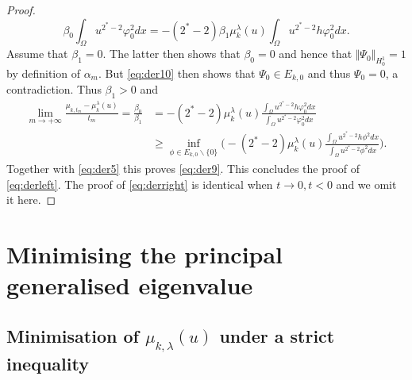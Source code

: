 \documentclass[10pt]{amsart}
\numberwithin{equation}{section}
\newcommand{\vp}{\varphi}
\newcommand{\Om}{\Omega}
\newcommand{\mkl}{\mu_{k}^{\lambda}}
\theoremstyle{plain}
\theoremstyle{remark}
\begin{document}
\begin{proof}
 $$\beta_0 \int_{\Om} u^{2^*-2} \vp_0^2dx = - (2^*-2) \beta_1 \mkl(u) \int_{\Om} u^{2^*-2} h \vp_0^2dx. $$
 Assume that $\beta_1 = 0$. The latter then shows that $\beta_0 = 0$ and hence that $\Vert \Psi_0\Vert_{H^1_0} = 1$ by definition of $\alpha_m$. But \eqref{eq:der10} then shows that $\Psi_0 \in E_{k,0}$ and thus $\Psi_0 = 0$, a contradiction. Thus $\beta_1 >0$ and
 $$ \begin{aligned}
\lim_{m \to + \infty} \frac{\mu_{k,t_m} - \mkl(u)}{t_m} 
 = \frac{\beta_0}{\beta_1}  & = -(2^*-2)  \mkl(u) \frac{\int_\Om u^{2^*-2}h \vp_0^2dx}{\int_\Om u^{2^*-2} \vp_0^2 dx} \\
 & \ge \inf_{\phi \in E_{k,0}\backslash \{0\}} \Bigg( - (2^*-2) \mkl(u) \frac{\int_\Om u^{2^*-2}h \phi^2dx}{\int_\Om u^{2^*-2} \phi^2 dx}\Bigg).
 \end{aligned} $$
Together with \eqref{eq:der5} this proves \eqref{eq:der9}. This concludes the proof of \eqref{eq:derleft}. The proof of \eqref{eq:derright} is identical when $t \to 0, t<0$ and we omit it here.
\end{proof}

\section{Minimising the principal generalised eigenvalue} \label{vp:minimisation}

\subsection{Minimisation of $\mu_{k,\lambda}(u)$ under a strict inequality}
\end{document}
